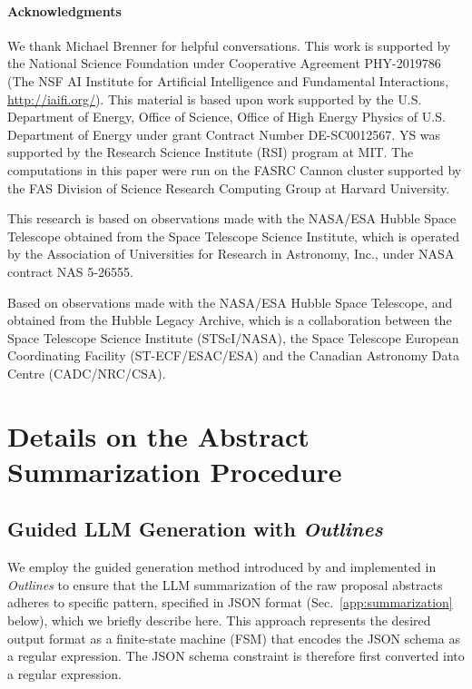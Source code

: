\documentclass[10pt]{article} %
\newcommand{\package}[1]{\textsl{#1}\xspace}
\begin{document}
\paragraph*{Acknowledgments}

We thank Michael Brenner for helpful conversations.
%
This work is supported by the National Science Foundation under Cooperative Agreement PHY-2019786 (The NSF AI Institute for Artificial Intelligence and Fundamental Interactions, \url{http://iaifi.org/}).
%
This material is based upon work supported by the U.S. Department of Energy, Office of Science, Office of High Energy Physics of U.S. Department of Energy under grant Contract Number  DE-SC0012567. 
%
YS was supported by the Research Science Institute (RSI) program at MIT.
%
The computations in this paper were run on the FASRC Cannon cluster supported by the FAS Division of Science Research Computing Group at Harvard University.

This research is based on observations made with the NASA/ESA Hubble Space Telescope obtained from the Space Telescope Science Institute, which is operated by the Association of Universities for Research in Astronomy, Inc., under NASA contract NAS 5-26555.

Based on observations made with the NASA/ESA Hubble Space Telescope, and obtained from the Hubble Legacy Archive, which is a collaboration between the Space Telescope Science Institute (STScI/NASA), the Space Telescope European Coordinating Facility (ST-ECF/ESAC/ESA) and the Canadian Astronomy Data Centre (CADC/NRC/CSA).





\appendix

\section{Details on the Abstract Summarization Procedure}

\subsection{Guided LLM Generation with \package{Outlines}}
\label{app:guided-generation}

We employ the guided generation method introduced by \citet{willard2023efficient} and implemented in \package{Outlines} to ensure that the LLM summarization of the raw proposal abstracts adheres to specific pattern, specified in JSON format (Sec.~\ref{app:summarization} below), which we briefly describe here. This approach represents the desired output format as a finite-state machine (FSM) that encodes the JSON schema as a regular expression. The JSON schema constraint is therefore first converted into a regular expression.
\end{document}

